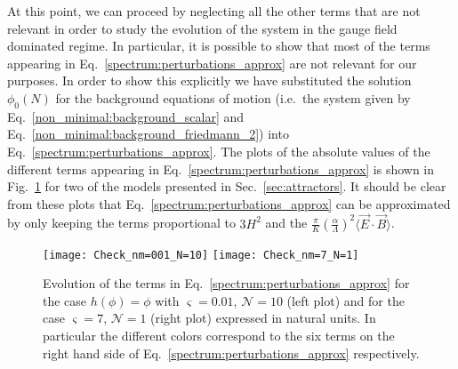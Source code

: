At this point, we can proceed by neglecting all the other terms that are not relevant in order to study the evolution of the system in the gauge field dominated regime. In particular, it is possible to show that most of the terms appearing in Eq.~\eqref{spectrum:perturbations_approx} are not relevant for our purposes. In order to show this explicitly we have substituted the solution $\phi_0(N)$ for the background equations of motion (i.e.\ the system given by Eq.~\eqref{non_minimal:background_scalar} and Eq.~\eqref{non_minimal:background_friedmann_2}) into Eq.~\eqref{spectrum:perturbations_approx}. The plots of the absolute values of the different terms appearing in Eq.~\eqref{spectrum:perturbations_approx} is shown in Fig.~\ref{fig:checks} for two of the models presented in Sec.~\ref{sec:attractors}. It should be clear from these plots that Eq.~\eqref{spectrum:perturbations_approx} can be approximated by only keeping the terms proportional to $3H^2$ and the $\frac{\pi}{ K} \left( \frac{\alpha}{\Lambda} \right)^2  \langle \vec{E} \cdot \vec{B} \rangle$. 

\begin{figure}
\centering
\texttt{[image: Check\_nm=001\_N=10]}
\texttt{[image: Check\_nm=7\_N=1]}
\caption{Evolution of the terms in Eq.~\eqref{spectrum:perturbations_approx} for the case $h(\phi) = \phi$ with $\varsigma = 0.01$, $\mathcal{N}=10$ (left plot) and for the case $\varsigma = 7$, $\mathcal{N}=1$ (right plot) expressed in natural units. In particular the different colors correspond to the six terms on the right hand side of Eq.~\eqref{spectrum:perturbations_approx} respectively.}
\label{fig:checks}
\end{figure}

